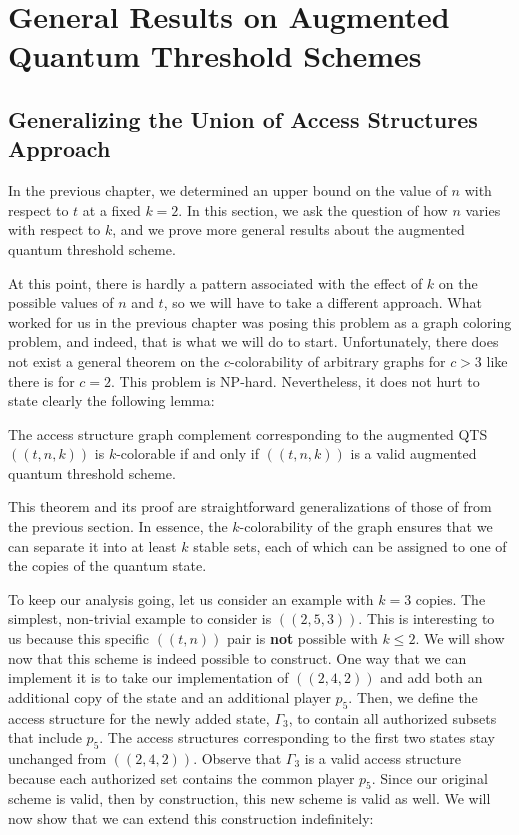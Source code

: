 \chapter{General Results on Augmented Quantum Threshold Schemes}

\section{Generalizing the Union of Access Structures Approach}

In the previous chapter, we determined an upper bound on the value of $n$ with respect to $t$ at a fixed $k=2$. In this section, we ask the question of how $n$ varies with respect to $k$, and we prove more general results about the augmented quantum threshold scheme. 

At this point, there is hardly a pattern associated with the effect of $k$ on the possible values of $n$ and $t$, so we will have to take a different approach. What worked for us in the previous chapter was posing this problem as a graph coloring problem, and indeed, that is what we will do to start. Unfortunately, there does not exist a general theorem on the $c$-colorability of arbitrary graphs for $c > 3$ like there is for $c=2$. This problem is NP-hard. Nevertheless, it does not hurt to state clearly the following lemma:

\begin{lemma}
    \label{lem:k-color-access}
    The access structure graph complement corresponding to the augmented QTS $((t,n,k))$ is $k$-colorable if and only if $((t,n,k))$ is a valid augmented quantum threshold scheme.
\end{lemma}

This theorem and its proof are straightforward generalizations of those of  from the previous section. In essence, the $k$-colorability of the graph ensures that we can separate it into at least $k$ stable sets, each of which can be assigned to one of the copies of the quantum state.

To keep our analysis going, let us consider an example with $k=3$ copies. The simplest, non-trivial example to consider is $((2,5,3))$. This is interesting to us because this specific $((t,n))$ pair is \textbf{not} possible with $k \leq 2$. We will show now that this scheme is indeed possible to construct. One way that we can implement it is to take our implementation of $((2,4,2))$ and add both an additional copy of the state and an additional player $p_5$. Then, we define the access structure for the newly added state, $\Gamma_3$, to contain all authorized subsets that include $p_5$. The access structures corresponding to the first two states stay unchanged from $((2,4,2))$. Observe that $\Gamma_3$ is a valid access structure because each authorized set contains the common player $p_5$. Since our original scheme is valid, then by construction, this new scheme is valid as well. We will now show that we can extend this construction indefinitely:

